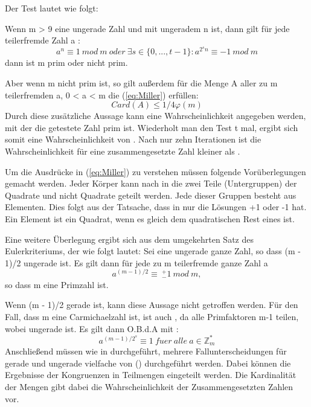 		 Der Test lautet wie folgt:
		 
		 Wenn m \myin {} > 9  eine ungerade Zahl und  mit ungeradem n ist, dann gilt für jede teilerfremde Zahl a \myin {}:		 
	 	\begin{equation} \label{eq:Miller}
			a^n \equiv 1~mod~m~oder~\exists s \in \{0,..., t - 1\} : a^{2^sn} \equiv -1~mod~m
		\end{equation}
		dann ist m prim oder nicht prim.
		
		Aber wenn m nicht prim ist, so gilt außerdem für die Menge A aller zu m teilerfremden a, 0 < a < m die (\ref{eq:Miller}) erfüllen:
	 	\begin{displaymath}
		 	Card(A) \leq 1/4 \varphi(m)
	 	\end{displaymath}
	 	Durch diese zusätzliche Aussage kann eine Wahrscheinlichkeit angegeben werden, mit der die getestete Zahl prim ist. Wiederholt man den Test t mal, ergibt sich somit eine Wahrscheinlichkeit von . Nach nur zehn Iterationen ist die Wahrscheinlichkeit für eine zusammengesetzte Zahl kleiner als .
	 	
	 	Um die Ausdrücke in (\ref{eq:Miller}) zu verstehen müssen folgende Vorüberlegungen gemacht werden.
	 	Jeder Körper  kann nach \cite{Algorithmische:Zahlentheorie} in die zwei Teile (Untergruppen) der Quadrate und nicht Quadrate geteilt werden. Jede dieser Gruppen besteht aus  Elementen. Dies folgt aus der Tatsache, dass  in  nur die Lösungen +1 oder -1 hat. Ein Element ist ein Quadrat, wenn es gleich dem quadratischen Rest eines  ist.
	 	
	 	Eine weitere Überlegung ergibt sich aus dem umgekehrten Satz des Eulerkriteriums, der wie folgt lautet:
	 	Sei  eine ungerade ganze Zahl, so dass (m - 1)/2 ungerade ist.
	 	Es gilt dann für jede zu m teilerfremde ganze Zahl a
	 	\begin{displaymath}
		 	a^{(m-1)/2} \equiv~^+_-1~mod~m,
	 	\end{displaymath}
	 	so dass m eine Primzahl ist.
	 	
	 	Wenn (m - 1)/2 gerade ist, kann diese Aussage nicht getroffen werden. Für den Fall, dass m eine Carmichaelzahl ist, ist auch  , da alle Primfaktoren m-1 teilen, wobei  ungerade ist. Es gilt dann O.B.d.A mit :
 		\begin{displaymath}
	 		a^{(m-1)/2^s} \equiv1 ~fuer~alle~a \in \mathbb{Z}^*_m
 		\end{displaymath}
 		Anschließend müssen wie in \cite{Algorithmische:Zahlentheorie} durchgeführt, mehrere Fallunterscheidungen für gerade und ungerade vielfache von () durchgeführt werden. Dabei können die Ergebnisse der Kongruenzen in Teilmengen eingeteilt werden. Die Kardinalität der Mengen gibt dabei die Wahrscheinlichkeit der Zusammengesetzten Zahlen vor.
 		

